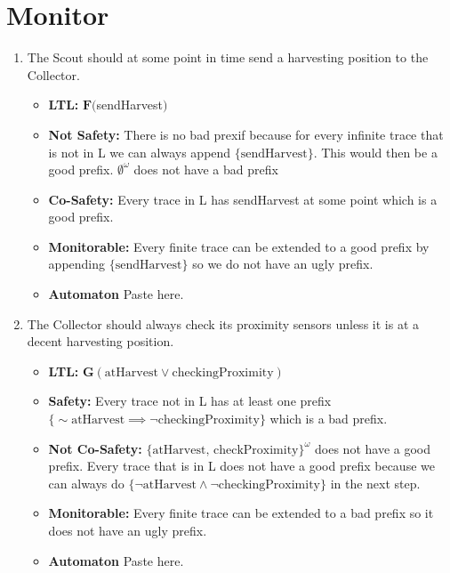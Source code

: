 \documentclass[12pt]{article}
\begin{document}
\lstset{language=C++}

\section*{Monitor}
\begin{enumerate}
	\item The Scout should at some point in time send a harvesting
position to the Collector.
	\begin{itemize}
		\item \textbf{LTL:} $\mathbf{F}($sendHarvest$)$
		\item \textbf{Not Safety:} There is no bad prexif because for every infinite trace that is not in L we can always append $\{\text{sendHarvest}\}$. This would then be a good prefix. $\emptyset ^{\omega}$ does not have a bad prefix
		\item \textbf{Co-Safety:} Every trace in L has sendHarvest at some point which is a good prefix.
		\item \textbf{Monitorable:} Every finite trace can be extended to a good prefix by appending $\{\text{sendHarvest}\}$ so we do not have an ugly prefix.
		\item \textbf{Automaton} Paste here.
		
		\end{itemize}
		
\item The Collector should always check its proximity sensors unless it is at a decent harvesting position.
	\begin{itemize}
		\item \textbf{LTL:} $\mathbf{G}(\text{atHarvest} \lor \text{checkingProximity})$
		\item \textbf{Safety:} Every trace not in L has at least one prefix \\
		$\{ \sim \text{atHarvest}  \implies \neg \text{checkingProximity}\}$ which is a bad prefix.
		\item \textbf{Not Co-Safety:} $\{ \text{atHarvest, checkProximity}\}^ {\omega}$ does not have a good prefix. Every trace that is in L does not have a good prefix because we can always do $\{ \neg \text{atHarvest}  \land \neg \text{checkingProximity}\}$ in the next step.
		\item \textbf{Monitorable:} Every finite trace can be extended to a bad prefix so it does not have an ugly prefix.
		\item \textbf{Automaton} Paste here.
	\end{itemize}		
	

\end{enumerate}
\end{document}
